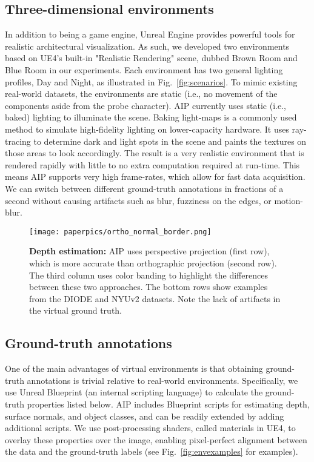 \documentclass[runningheads]{llncs}
\begin{document}
\subsection{Three-dimensional environments}
In addition to being a game engine, Unreal Engine provides powerful tools for realistic architectural visualization. As such, we developed two environments based on UE4's built-in "Realistic Rendering" scene, dubbed Brown Room and Blue Room in our experiments. Each environment has two general lighting profiles, Day and Night, as illustrated in Fig.~\ref{fig:scenarios}. To mimic existing real-world datasets, the environments are static (i.e., no movement of the components aside from the probe character). AIP currently uses static (i.e., baked) lighting to illuminate the scene. Baking light-maps is a commonly used method to simulate high-fidelity lighting on lower-capacity hardware. It uses ray-tracing to determine dark and light spots in the scene and paints the textures on those areas to look accordingly. The result is a very realistic environment that is rendered rapidly with little to no extra computation required at run-time. This means AIP supports very high frame-rates, which allow for fast data acquisition. We can switch between different ground-truth annotations in fractions of a second without causing artifacts such as blur, fuzziness on the edges, or motion-blur. 
\begin{figure}[htbp]
\centerline{\texttt{[image: paperpics/ortho\_normal\_border.png]}}
\caption{\textbf{Depth estimation:} AIP uses perspective projection (first row), which is more accurate than orthographic projection (second row). The third column uses color banding to highlight the differences between these two approaches. The bottom rows show examples from the DIODE and NYUv2 datasets. Note the lack of artifacts in the virtual ground truth.}
\label{fig:prespvortho}
\vspace{-1em}
\end{figure}


\subsection{Ground-truth annotations}
One of the main advantages of virtual environments is that obtaining ground-truth annotations is trivial relative to real-world environments. Specifically, we use Unreal Blueprint (an internal scripting language) to calculate the ground-truth properties listed below. AIP includes Blueprint scripts for estimating depth, surface normals, and object classes, and can be readily extended by adding additional scripts. We use post-processing shaders, called materials in UE4, to overlay these properties over the image, enabling pixel-perfect alignment between the data and the ground-truth labels (see Fig.~\ref{fig:envexamples} for examples).
\vspace{0.4em}
\end{document}
